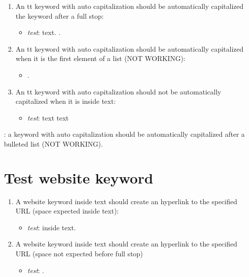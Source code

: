 \begin{enumerate}

\item An tt keyword with auto capitalization should be automatically capitalized the keyword after a full stop:
\begin{itemize}
\item \textit{test}: text. \autocapTtKeywordExample.
\end{itemize}

\item An tt keyword with auto capitalization should be automatically capitalized when it is the first element of a list (NOT WORKING):
\begin{itemize}
\item \autocapTtKeywordExample.
\end{itemize}

\item An tt keyword with auto capitalization should not be automatically capitalized when it is inside text:
\begin{itemize}
\item \textit{test}: text \autocapTtKeywordExample text
\end{itemize}

\end{enumerate}

\autocapTtKeywordExample: a keyword with auto capitalization should be automatically capitalized after a bulleted list (NOT WORKING).

\section{Test website keyword}

\begin{enumerate}

\item A website keyword inside text should create an hyperlink to the specified URL (space expected inside text):
\begin{itemize}
\item \textit{test}: \myWebpage inside text.
\end{itemize}

\item A website keyword inside text should create an hyperlink to the specified URL (space not expected before full stop)
\begin{itemize}
\item \textit{test}: \myWebpage.
\end{itemize}

\end{enumerate}

